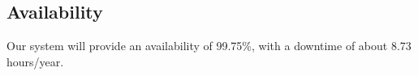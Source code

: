 \subsection{Availability}
Our system will provide an availability of 99.75\%, with a downtime of about 8.73 hours/year.